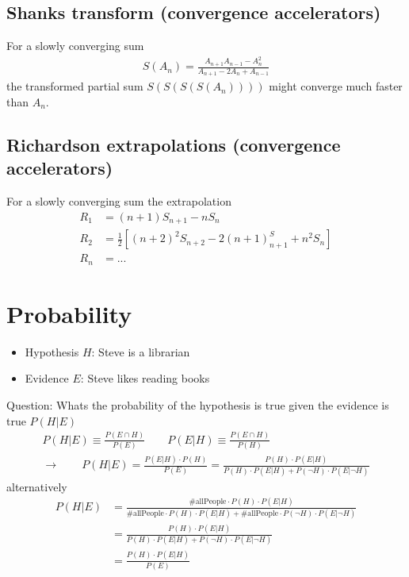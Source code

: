 \documentclass[10pt,a4paper]{book}
\theoremstyle{definition}
\begin{document}
\subsection{Shanks transform (convergence accelerators)}
For a slowly converging sum
\begin{align}
S(A_n)=\frac{A_{n+1}A_{n-1}-A_n^2}{A_{n+1}-2A_n+A_{n-1}}
\end{align}
the transformed partial sum $S(S(S(S(A_n))))$ might converge much faster than $A_n$.
\subsection{Richardson extrapolations (convergence accelerators)}
For a slowly converging sum the extrapolation
\begin{align}
R_1&=(n+1)S_{n+1}-nS_n\\
R_2&=\frac{1}{2}\left[(n+2)^2S_{n+2}-2(n+1)^S_{n+1}+n^2S_n\right]\\
R_n&=...
\end{align}

\newpage
\section{Probability}

\begin{itemize}
\item Hypothesis $H$: Steve is a librarian
\item Evidence $E$: Steve likes reading books
\end{itemize}
Question: Whats the probability of the hypothesis is true given the evidence is true $P(H|E)$ 
\begin{align}
   P(H|E)\equiv\frac{P(E\cap H)}{P(E)}\qquad P(E|H)\equiv\frac{P(E\cap H)}{P(H)}\\
   \rightarrow\qquad P(H|E)=\frac{P(E|H)\cdot P(H)}{P(E)}=\frac{P(H)\cdot P(E|H)}{P(H)\cdot P(E|H)+ P(\neg H)\cdot P(E|\neg H)}
\end{align}
alternatively
\begin{align}
  P(H|E)&=\frac{\#\text{allPeople}\cdot P(H)\cdot P(E|H)}{\#\text{allPeople}\cdot P(H)\cdot P(E|H)+\#\text{allPeople}\cdot P(\neg H)\cdot P(E|\neg H)}\\
  &=\frac{P(H)\cdot P(E|H)}{P(H)\cdot P(E|H)+ P(\neg H)\cdot P(E|\neg H)}\\
  &=\frac{P(H)\cdot P(E|H)}{P(E)}
\end{align}
\end{document}

